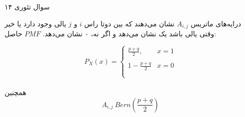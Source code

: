 سوال تئوری ۱۴

درایه‌های ماتریس
$A_{i, j}$
نشان می‌دهند که بین دوتا راس
$i$
و
$j$
یالی وجود دارد یا خیر 
وقتی یالی باشد یک نشان می‌دهد و اگر نه، ۰ نشان می‌دهد.
$PMF$
حاصل:

$$ P_{X}(x) = \begin{cases}
\frac{p + q}{2}, & x = 1\\\\
1 - \frac{p + q}{2} & x = 0 \\\\
\end{cases}
$$
\\
همچنین
$$A_{i, j} ~ Bern(\frac{p + q}{2})$$